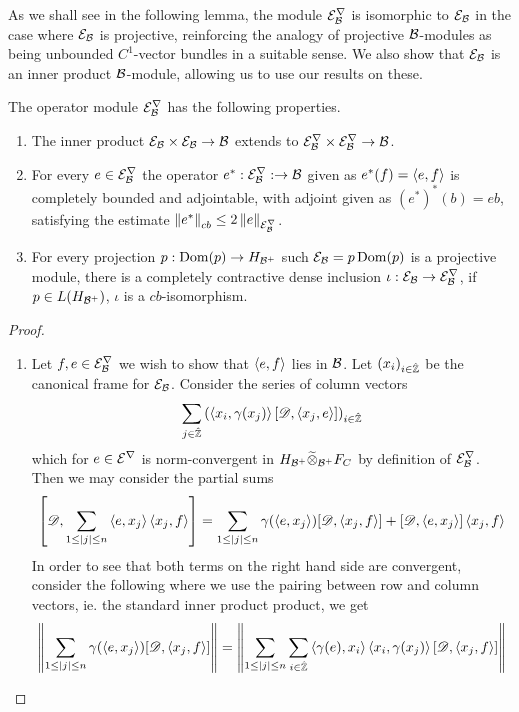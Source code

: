 As we shall see in the following lemma, the module $\mathcal{E}_{\mathcal{B}}^\nabla$ is isomorphic to $\mathcal{E}_{\mathcal{B}}$ in the case where $\mathcal{E}_{\mathcal{B}}$ is projective, reinforcing the analogy of projective $\mathcal{B}$-modules as being unbounded $C^1$-vector bundles in a suitable sense. We also show that $\mathcal{E}_{\mathcal{B}}$ is an inner product $\mathcal{B}$-module, allowing us to use our results on these. 
\begin{theorem}
	The operator module $\mathcal{E}_{\mathcal{B}}^\nabla$ has the following properties. 
	\begin{enumerate}
		\item
			The inner product $\mathcal{E}_{\mathcal{B}}\times \mathcal{E}_{\mathcal{B}} \to \mathcal{B}$ extends to $\mathcal{E}_{\mathcal{B}}^\nabla\times \mathcal{E}_{\mathcal{B}}^\nabla\to \mathcal{B}$. 
		\item
			For every $e\in \mathcal{E}_{\mathcal{B}}^\nabla$ the operator $e^*:\mathcal{E}_{\mathcal{B}}^\nabla:\to \mathcal{B}$ given as $e^*(f)=\left \langle e,f \right \rangle$ is completely bounded and adjointable, with adjoint given as $(e^*)^*(b)=eb$, satisfying the estimate $\left \Vert e^* \right \Vert_{cb}\leq 2\left \Vert e \right \Vert_{\mathcal{E}_{\mathcal{B}}^\nabla}$.
		\item
			For every projection $p:\operatorname{Dom} (p)\to H_{\mathcal{B}^+}$ such $\mathcal{E}_{\mathcal{B}}=p\operatorname{Dom} (p)$ is a projective module, there is a completely contractive dense inclusion $\iota:\mathcal{E}_{\mathcal{B}} \to \mathcal{E}_{\mathcal{B}}^\nabla$, if $p\in L(H_{\mathcal{B}^+})$, $\iota$ is a $cb$-isomorphism. 
	\end{enumerate}
	\begin{proof}
	\begin{enumerate}
	\item
		Let $f,e\in \mathcal{E}^\nabla_{\mathcal{B}}$ we wish to show that $\left \langle e,f \right \rangle$ lies in $\mathcal{B}$. Let $(x_i)_{i\in \hat{\mathbb{Z}}}$ be the canonical frame for $\mathcal{E}_{\mathcal{B}}$. Consider the series of column vectors   
		\begin{align*}
			\sum_{j\in \hat{\mathbb{Z}}} \left ( \left \langle x_i,\gamma(x_j) \right \rangle[\mathscr{D},\left \langle x_j,e \right \rangle] \right )_{i\in \hat{\mathbb{Z}}}
		\end{align*}
		which for $e\in \mathcal{E}^\nabla$ is norm-convergent in $H_{\mathcal{B}^+}\widetilde{\otimes}_{\mathcal{B}^+} F_C$ by definition of $\mathcal{E}_{\mathcal{B}}^\nabla$. 
		Then we may consider the partial sums 
		\begin{align*}
			\left [ \mathscr{D},\sum_{1\leq |j|\leq n} \left \langle e,x_j \right \rangle\left \langle x_j,f \right \rangle \right ]=\sum_{1\leq |j|\leq n} \gamma(\left \langle e,x_j \right \rangle)[\mathscr{D},\left \langle x_j,f \right \rangle]+[\mathscr{D},\left \langle e,x_j \right \rangle]\left \langle x_j,f \right \rangle
		\end{align*}
		In order to see that both terms on the right hand side are convergent, consider the following where we use the pairing between row and column vectors, ie. the standard inner product product, we get 
		\begin{align*}
			\norm{\sum_{1\leq |j|\leq n} \gamma(\ip{e}{x_j})[\D,\ip{x_j}{f}]}&=\norm{\sum_{1\leq |j|\leq n}\sum_{i\in \Zred} \ip{\gamma(e)}{x_i}\ip{x_i}{\gamma(x_j)}[\D,\ip{x_j}{f}]}  \\

\end{align*}
\end{enumerate}
\end{proof}
\end{theorem}
